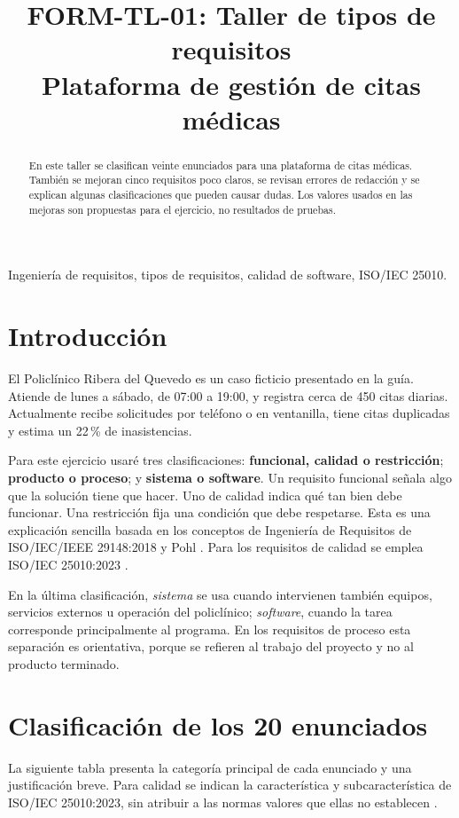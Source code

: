 \documentclass[conference,onecolumn]{IEEEtran}
\title{FORM-TL-01: Taller de tipos de requisitos\\Plataforma de gestión de citas médicas}
\author{\IEEEauthorblockN{Mendoza Palma Allan Jeremy}\IEEEauthorblockA{Carrera de Software\\
Universidad Técnica Estatal de Quevedo\\
Ingeniería de Requerimientos (ISR-401), cuarto nivel}}
\begin{document}
\maketitle
\begin{abstract}
En este taller se clasifican veinte enunciados para una plataforma de citas médicas. También se mejoran cinco requisitos poco claros, se revisan errores de redacción y se explican algunas clasificaciones que pueden causar dudas. Los valores usados en las mejoras son propuestas para el ejercicio, no resultados de pruebas.
\end{abstract}
\begin{IEEEkeywords}
Ingeniería de requisitos, tipos de requisitos, calidad de software, ISO/IEC 25010.
\end{IEEEkeywords}

\section{Introducción}
El Policlínico Ribera del Quevedo es un caso ficticio presentado en la guía. Atiende de lunes a sábado, de 07:00 a 19:00, y registra cerca de 450 citas diarias. Actualmente recibe solicitudes por teléfono o en ventanilla, tiene citas duplicadas y estima un 22\,\% de inasistencias.

Para este ejercicio usaré tres clasificaciones: \textbf{funcional, calidad o restricción}; \textbf{producto o proceso}; y \textbf{sistema o software}. Un requisito funcional señala algo que la solución tiene que hacer. Uno de calidad indica qué tan bien debe funcionar. Una restricción fija una condición que debe respetarse. Esta es una explicación sencilla basada en los conceptos de Ingeniería de Requisitos de ISO/IEC/IEEE 29148:2018 y Pohl \cite{ISO29148,Pohl2025}. Para los requisitos de calidad se emplea ISO/IEC 25010:2023 \cite{ISO25010}.

En la última clasificación, \emph{sistema} se usa cuando intervienen también equipos, servicios externos u operación del policlínico; \emph{software}, cuando la tarea corresponde principalmente al programa. En los requisitos de proceso esta separación es orientativa, porque se refieren al trabajo del proyecto y no al producto terminado.

\section{Clasificación de los 20 enunciados}
La siguiente tabla presenta la categoría principal de cada enunciado y una justificación breve. Para calidad se indican la característica y subcaracterística de ISO/IEC 25010:2023, sin atribuir a las normas valores que ellas no establecen \cite{ISO29148,ISO25010}.
\end{document}
